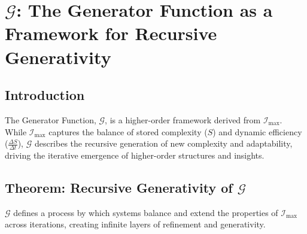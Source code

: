 \documentclass[12pt]{article}
\begin{document}
\section{\(\mathcal{G}\): The Generator Function as a Framework for Recursive Generativity}

\subsection{Introduction}
The Generator Function, \(\mathcal{G}\), is a higher-order framework derived from \(\mathcal{I}_{\text{max}}\). While \(\mathcal{I}_{\text{max}}\) captures the balance of stored complexity (\(S\)) and dynamic efficiency (\(\frac{\Delta S}{\Delta t}\)), \(\mathcal{G}\) describes the recursive generation of new complexity and adaptability, driving the iterative emergence of higher-order structures and insights.

\subsection{Theorem: Recursive Generativity of \(\mathcal{G}\)}
\(\mathcal{G}\) defines a process by which systems balance and extend the properties of \(\mathcal{I}_{\text{max}}\) across iterations, creating infinite layers of refinement and generativity.
\end{document}
